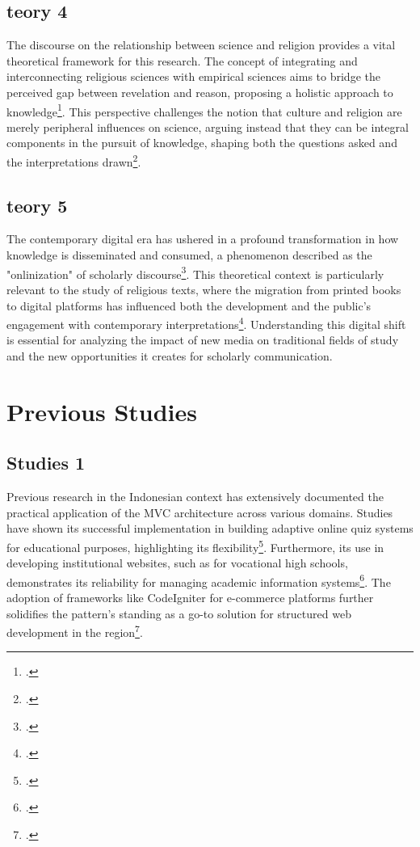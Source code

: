 		\subsection{teory 4}
		The discourse on the relationship between science and religion provides a vital theoretical framework for this research. The concept of integrating and interconnecting religious sciences with empirical sciences aims to bridge the perceived gap between revelation and reason, proposing a holistic approach to knowledge\footcite{muqoyyidin2014}. This perspective challenges the notion that culture and religion are merely peripheral influences on science, arguing instead that they can be integral components in the pursuit of knowledge, shaping both the questions asked and the interpretations drawn\footcite{muslih2010}.
		
		\subsection{teory 5}
		The contemporary digital era has ushered in a profound transformation in how knowledge is disseminated and consumed, a phenomenon described as the "onlinization" of scholarly discourse\footcite{maulana2021}. This theoretical context is particularly relevant to the study of religious texts, where the migration from printed books to digital platforms has influenced both the development and the public's engagement with contemporary interpretations\footcite{sihabussalam2024}. Understanding this digital shift is essential for analyzing the impact of new media on traditional fields of study and the new opportunities it creates for scholarly communication.
		
	\section{Previous Studies}
		\subsection{Studies 1}
		Previous research in the Indonesian context has extensively documented the practical application of the MVC architecture across various domains. Studies have shown its successful implementation in building adaptive online quiz systems for educational purposes, highlighting its flexibility\footcite{hidayat2012}. Furthermore, its use in developing institutional websites, such as for vocational high schools, demonstrates its reliability for managing academic information systems\footcite{wijaya2019}. The adoption of frameworks like CodeIgniter for e-commerce platforms further solidifies the pattern's standing as a go-to solution for structured web development in the region\footcite{suharsana2016}.
		
